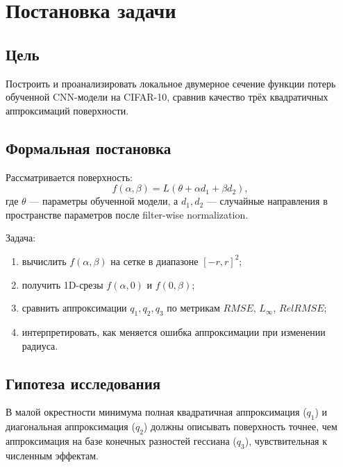 \section{Постановка задачи}

\subsection{Цель}
Построить и проанализировать локальное двумерное сечение функции потерь обученной CNN-модели на CIFAR-10, сравнив качество трёх квадратичных аппроксимаций поверхности.

\subsection{Формальная постановка}
Рассматривается поверхность:
\[
f(\alpha, \beta) = L(\theta + \alpha d_1 + \beta d_2),
\]
где $\theta$ --- параметры обученной модели, а $d_1, d_2$ --- случайные направления в пространстве параметров после filter-wise normalization.

Задача:
\begin{enumerate}
    \item вычислить $f(\alpha,\beta)$ на сетке в диапазоне $[-r, r]^2$;
    \item получить 1D-срезы $f(\alpha,0)$ и $f(0,\beta)$;
    \item сравнить аппроксимации $q_1, q_2, q_3$ по метрикам $RMSE$, $L_\infty$, $RelRMSE$;
    \item интерпретировать, как меняется ошибка аппроксимации при изменении радиуса.
\end{enumerate}

\subsection{Гипотеза исследования}
В малой окрестности минимума полная квадратичная аппроксимация ($q_1$) и диагональная аппроксимация ($q_2$) должны описывать поверхность точнее, чем аппроксимация на базе конечных разностей гессиана ($q_3$), чувствительная к численным эффектам.
